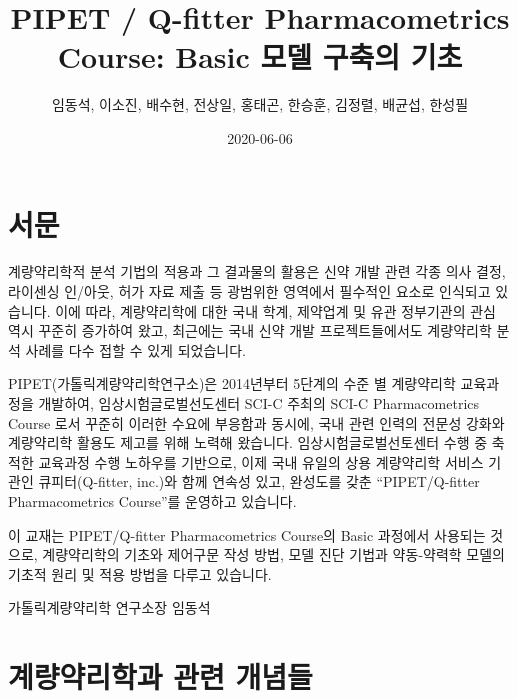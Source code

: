 \documentclass[
  10pt,
  krantz2,
  a4paper]{krantz}
\title{PIPET / Q-fitter Pharmacometrics Course: Basic 모델 구축의 기초}
\author{임동석, 이소진, 배수현, 전상일, 홍태곤, 한승훈, 김정렬, 배균섭, 한성필}
\date{2020-06-06}
\theoremstyle{definition}
\theoremstyle{definition}
\theoremstyle{definition}
\theoremstyle{remark}
\begin{document}
\maketitle

\thispagestyle{empty}
\begin{center}
\end{center}

\setlength{\abovedisplayskip}{-5pt}
\setlength{\abovedisplayshortskip}{-5pt}

{
\hypersetup{linkcolor=}
\setcounter{tocdepth}{2}
\tableofcontents
}
\listoftables
\listoffigures
{}
\hypertarget{uxc11cuxbb38}{%
\chapter*{서문}\label{uxc11cuxbb38}}


계량약리학적 분석 기법의 적용과 그 결과물의 활용은 신약 개발 관련 각종 의사 결정, 라이센싱 인/아웃, 허가 자료 제출 등 광범위한 영역에서 필수적인 요소로 인식되고 있습니다. 이에 따라, 계량약리학에 대한 국내 학계, 제약업계 및 유관 정부기관의 관심 역시 꾸준히 증가하여 왔고, 최근에는 국내 신약 개발 프로젝트들에서도 계량약리학 분석 사례를 다수 접할 수 있게 되었습니다.

PIPET(가톨릭계량약리학연구소)은 2014년부터 5단계의 수준 별 계량약리학 교육과정을 개발하여, 임상시험글로벌선도센터 SCI-C 주최의 SCI-C Pharmacometrics Course 로서 꾸준히 이러한 수요에 부응함과 동시에, 국내 관련 인력의 전문성 강화와 계량약리학 활용도 제고를 위해 노력해 왔습니다. 임상시험글로벌선토센터 수행 중 축적한 교육과정 수행 노하우를 기반으로, 이제 국내 유일의 상용 계량약리학 서비스 기관인 큐피터(Q-fitter, inc.)와 함께 연속성 있고, 완성도를 갖춘 ``PIPET/Q-fitter Pharmacometrics Course''를 운영하고 있습니다.

이 교재는 PIPET/Q-fitter Pharmacometrics Course의 Basic 과정에서 사용되는 것으로, 계량약리학의 기초와 제어구문 작성 방법, 모델 진단 기법과 약동-약력학 모델의 기초적 원리 및 적용 방법을 다루고 있습니다.

가톨릭계량약리학 연구소장 \hfill 임동석

\mainmatter

\hypertarget{intro}{%
\chapter{계량약리학과 관련 개념들}\label{intro}}
\end{document}
